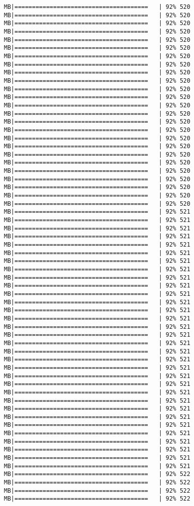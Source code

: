 \documentclass[
]{article}
\begin{document}
\begin{verbatim}
MB|======================================   | 92% 520 MB|======================================   | 92% 520 MB|======================================   | 92% 520 MB|======================================   | 92% 520 MB|======================================   | 92% 520 MB|======================================   | 92% 520 MB|======================================   | 92% 520 MB|======================================   | 92% 520 MB|======================================   | 92% 520 MB|======================================   | 92% 520 MB|======================================   | 92% 520 MB|======================================   | 92% 520 MB|======================================   | 92% 520 MB|======================================   | 92% 520 MB|======================================   | 92% 520 MB|======================================   | 92% 520 MB|======================================   | 92% 520 MB|======================================   | 92% 520 MB|======================================   | 92% 520 MB|======================================   | 92% 520 MB|======================================   | 92% 520 MB|======================================   | 92% 520 MB|======================================   | 92% 520 MB|======================================   | 92% 520 MB|======================================   | 92% 520 MB|======================================   | 92% 521 MB|======================================   | 92% 521 MB|======================================   | 92% 521 MB|======================================   | 92% 521 MB|======================================   | 92% 521 MB|======================================   | 92% 521 MB|======================================   | 92% 521 MB|======================================   | 92% 521 MB|======================================   | 92% 521 MB|======================================   | 92% 521 MB|======================================   | 92% 521 MB|======================================   | 92% 521 MB|======================================   | 92% 521 MB|======================================   | 92% 521 MB|======================================   | 92% 521 MB|======================================   | 92% 521 MB|======================================   | 92% 521 MB|======================================   | 92% 521 MB|======================================   | 92% 521 MB|======================================   | 92% 521 MB|======================================   | 92% 521 MB|======================================   | 92% 521 MB|======================================   | 92% 521 MB|======================================   | 92% 521 MB|======================================   | 92% 521 MB|======================================   | 92% 521 MB|======================================   | 92% 521 MB|======================================   | 92% 521 MB|======================================   | 92% 521 MB|======================================   | 92% 521 MB|======================================   | 92% 521 MB|======================================   | 92% 521 MB|======================================   | 92% 522 MB|======================================   | 92% 522 MB|======================================   | 92% 522 MB|======================================   | 92% 522 
\end{verbatim}
\end{document}
